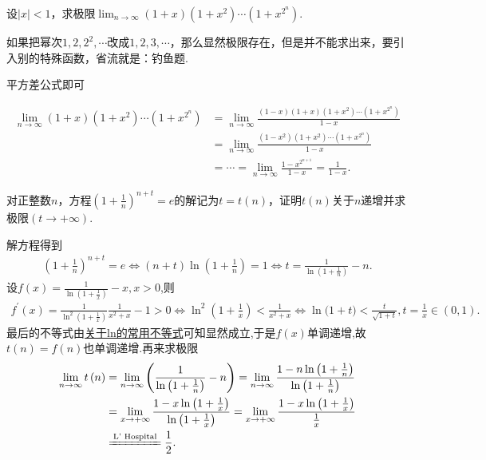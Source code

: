 \documentclass[../../main.tex]{subfiles}%
\begin{document}
\begin{example}
设\(\vert x\vert < 1\)，求极限\(\lim_{n\rightarrow\infty}(1 + x)(1 + x^2)\cdots(1 + x^{2^n})\).
\end{example}
\begin{remark}
如果把幂次\(1,2,2^2,\cdots\)改成\(1,2,3,\cdots\)，那么显然极限存在，但是并不能求出来，要引入别的特殊函数，省流就是：钓鱼题.
\end{remark}
\begin{note}
平方差公式即可
\end{note}
\begin{solution}

\begin{align*}
\lim_{n\rightarrow \infty} (1+x)(1+x^2)\cdots (1+x^{2^n})&=\lim_{n\rightarrow \infty} \frac{(1-x)(1+x)(1+x^2)\cdots (1+x^{2^n})}{1-x}
\\
&=\lim_{n\rightarrow \infty} \frac{(1-x^2)(1+x^2)\cdots (1+x^{2^n})}{1-x}\\
&=\cdots =\lim_{n\rightarrow \infty} \frac{1-x^{2^{n+1}}}{1-x}=\frac{1}{1-x}.
\end{align*}

\end{solution}

\begin{example}
对正整数\(n\)，方程\(\left(1 + \frac{1}{n}\right)^{n + t}=e\)的解记为\(t = t(n)\)，证明\(t(n)\)关于\(n\)递增并求极限\((t\to +\infty)\).
\end{example}
\begin{solution}

解方程得到
\begin{align*}
\left(1 + \frac{1}{n}\right)^{n + t}=e\Leftrightarrow(n + t)\ln\left(1 + \frac{1}{n}\right)=1\Leftrightarrow t=\frac{1}{\ln\left(1 + \frac{1}{n}\right)}-n.
\end{align*}
设$f(x)=\frac{1}{\ln\left(1 + \frac{1}{x}\right)}-x,x>0$,则
\begin{align*}
f^\prime(x)=\frac{1}{\ln^{2}\left(1 + \frac{1}{x}\right)}\frac{1}{x^{2}+x}-1>0
\Leftrightarrow\ln^{2}\left(1 + \frac{1}{x}\right)<\frac{1}{x^{2}+x}\Leftrightarrow\ln\mathrm{(}1+t)<\frac{t}{\sqrt{1+t}},t=\frac{1}{x}\in \left( 0,1 \right) .
\end{align*}
最后的不等式由\hyperref[proposition:指数对数函数不等式1]{关于ln的常用不等式}可知显然成立,于是$f(x)$单调递增,故$t(n)=f(n)$也单调递增.再来求极限
\begin{align*}
\lim_{n\rightarrow \infty} t\left( n \right) &=\lim_{n\rightarrow \infty} \left( \frac{1}{\ln \left( 1+\frac{1}{n} \right)}-n \right) =\lim_{n\rightarrow \infty} \frac{1-n\ln \left( 1+\frac{1}{n} \right)}{\ln \left( 1+\frac{1}{n} \right)}
\\
&=\lim_{x\rightarrow +\infty} \frac{1-x\ln \left( 1+\frac{1}{x} \right)}{\ln \left( 1+\frac{1}{x} \right)}=\lim_{x\rightarrow +\infty} \frac{1-x\ln \left( 1+\frac{1}{x} \right)}{\frac{1}{x}}
\\
&\xlongequal{\text{L' Hospital}}\frac{1}{2}.
\end{align*}

\end{solution}
\end{document}
